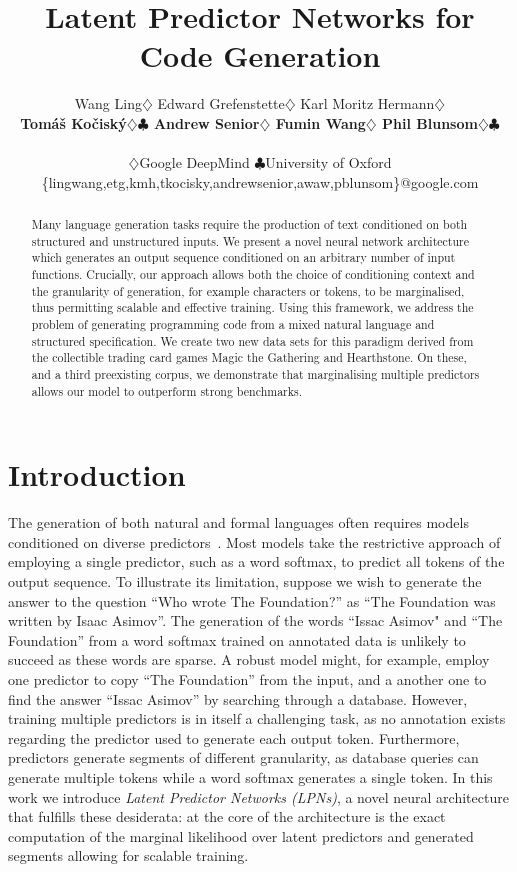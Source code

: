 \documentclass[11pt]{article}
\title{Latent Predictor Networks for Code Generation}
\author{
Wang Ling$\diamondsuit$ Edward Grefenstette$\diamondsuit$ Karl Moritz Hermann$\diamondsuit$
\\
{\bf Tom\'a\v{s} Ko\v{c}isk\'y$\diamondsuit$$\clubsuit$ Andrew Senior$\diamondsuit$ Fumin Wang$\diamondsuit$ Phil Blunsom$\diamondsuit$$\clubsuit$}
\\
\\
$\diamondsuit$Google DeepMind $\clubsuit$University of Oxford
\\
\{lingwang,etg,kmh,tkocisky,andrewsenior,awaw,pblunsom\}@google.com
}\date{}
\begin{document}
\maketitle

\begin{abstract}
Many language generation tasks require the production of text
conditioned on both structured and unstructured inputs. We
present a novel neural network architecture which generates an output sequence
conditioned on an arbitrary number of input functions. Crucially, our approach
allows both the choice of conditioning context and the granularity of
generation, for example characters or tokens, to be marginalised, thus
permitting scalable and effective training.  Using this framework, we address
the problem of generating programming code from a mixed natural language and
structured specification. We create two new data sets for this paradigm derived
from the collectible trading card games Magic the Gathering and Hearthstone. On
these, and a third preexisting corpus, we demonstrate that marginalising
multiple predictors allows our model to outperform strong benchmarks.

\end{abstract}

\section{Introduction}

The generation of both natural and formal languages often requires models conditioned on diverse predictors~\cite{Koehn:2007:MOS:1557769.1557821,Wong:2006:LSP:1220835.1220891}. Most models take the restrictive approach of employing a single predictor, such as a word softmax, to predict all tokens of the output sequence. To illustrate its limitation, suppose we wish to generate the answer to the question ``Who wrote The Foundation?'' as ``The Foundation was written by Isaac Asimov''. The generation of the words ``Issac Asimov" and ``The Foundation'' from a word softmax trained on annotated data is unlikely to succeed as these words are sparse. A robust model might, for example, employ one predictor to copy ``The Foundation'' from the input, and a another one to find the answer ``Issac Asimov'' by searching through a database. However, training multiple predictors is in itself a challenging task, as no annotation exists regarding the predictor used to generate each output token. Furthermore, predictors generate segments of different granularity, as database queries can generate multiple tokens while a word softmax generates a single token. In this work we introduce \emph{Latent Predictor Networks (LPNs)}, a novel neural architecture that fulfills these desiderata: at the core of the architecture is the exact computation of the marginal likelihood over latent predictors and generated segments allowing for scalable training.
\end{document}
